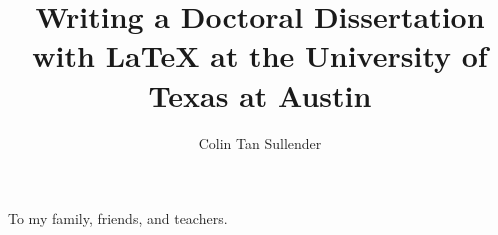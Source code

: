 \documentclass[12pt]{report}
\author{Colin Tan Sullender}
\title{Writing a Doctoral Dissertation with \LaTeX{} at the University of Texas at Austin}
\begin{document}
\copyrightpage      %
\commcertpage       %
\titlepage          %


\begin{dedication}
To my family, friends, and teachers.
\end{dedication}


\begin{acknowledgments}

\blindtext

\end{acknowledgments}


\utabstract
\indent
\blindtext

\tableofcontents
\listoftables
\listoffigures










\appendices








\end{document}
